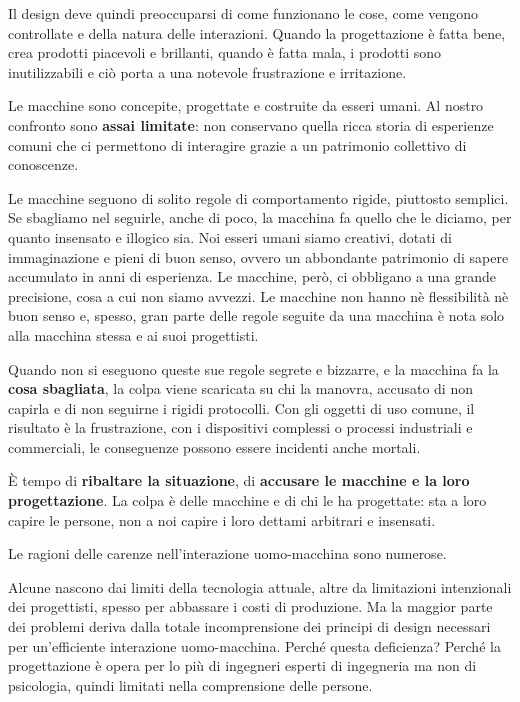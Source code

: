\documentclass[a4paper,11pt,oneside]{book}
\begin{document}
Il design deve quindi preoccuparsi di come funzionano le cose, come vengono controllate e della natura delle interazioni. Quando la progettazione è fatta bene, crea prodotti piacevoli e brillanti, quando è fatta mala, i prodotti sono inutilizzabili e ciò porta a una notevole frustrazione e irritazione.

Le macchine sono concepite, progettate e costruite da esseri umani. Al nostro confronto sono \textbf{assai limitate}: non conservano quella ricca storia di esperienze comuni che ci permettono di interagire grazie a un patrimonio collettivo di conoscenze.

Le macchine seguono di solito regole di comportamento rigide, piuttosto semplici. Se sbagliamo nel seguirle, anche di poco, la macchina fa quello che le diciamo, per quanto insensato e illogico sia. Noi esseri umani siamo creativi, dotati di immaginazione e pieni di buon senso, ovvero un abbondante patrimonio di sapere accumulato in anni di esperienza. Le macchine, però, ci obbligano a una grande precisione, cosa a cui non siamo avvezzi. Le macchine non hanno nè flessibilità nè buon senso e, spesso, gran parte delle regole seguite da una macchina è nota solo alla macchina stessa e ai suoi progettisti.

Quando non si eseguono queste sue regole segrete e bizzarre, e la macchina fa la \textbf{cosa sbagliata}, la colpa viene scaricata su chi la manovra, accusato di non capirla e di non seguirne i rigidi protocolli. Con gli oggetti di uso comune, il risultato è la frustrazione, con i dispositivi complessi o processi industriali e commerciali, le conseguenze possono essere incidenti anche mortali.

È tempo di \textbf{ribaltare la situazione}, di \textbf{accusare le macchine e la loro progettazione}. La colpa è delle macchine e di chi le ha progettate: sta a loro capire le persone, non a noi capire i loro dettami arbitrari e insensati.

Le ragioni delle carenze nell'interazione uomo-macchina sono numerose.

Alcune nascono dai limiti della tecnologia attuale, altre da limitazioni intenzionali dei progettisti, spesso per abbassare i costi di produzione. Ma la maggior parte dei problemi deriva dalla totale incomprensione dei principi di design necessari per un'efficiente interazione uomo-macchina. Perché questa deficienza? Perché la progettazione è opera per lo più di ingegneri esperti di ingegneria ma non di psicologia, quindi limitati nella comprensione delle persone.
\end{document}

